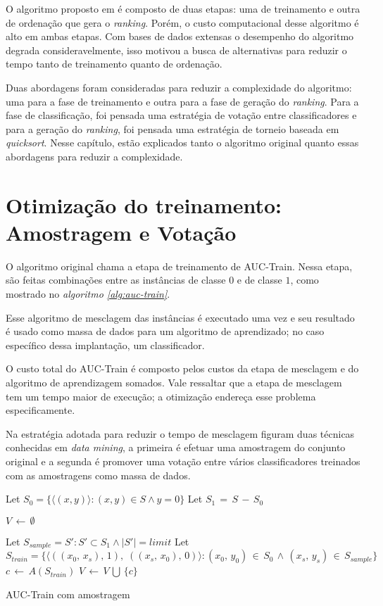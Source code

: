 O algoritmo proposto em é composto de duas etapas: uma de treinamento e outra de ordenação que gera o \emph{ranking}. Porém, o custo computacional desse algoritmo é alto em ambas etapas. Com bases de dados extensas o desempenho do algoritmo degrada consideravelmente, isso motivou a busca de alternativas para reduzir o tempo tanto de treinamento quanto de ordenação.

Duas abordagens foram consideradas para reduzir a complexidade do algoritmo: uma para a fase de treinamento e outra para a fase de geração do \emph{ranking}. Para a fase de classificação, foi pensada uma estratégia de votação entre classificadores e para a geração do \emph{ranking}, foi pensada uma estratégia de torneio baseada em \emph{quicksort}. Nesse capítulo, estão explicados tanto o algoritmo original quanto essas abordagens para reduzir a complexidade.

\section{Otimização do treinamento: Amostragem e Votação}
O algoritmo original chama a etapa de treinamento de AUC-Train. Nessa etapa, são feitas combinações entre as instâncias de classe $0$ e de classe $1$, como mostrado no \emph{algoritmo \ref{alg:auc-train}}.

Esse algoritmo de mesclagem das instâncias é executado uma vez e seu resultado é usado como massa de dados para um algoritmo de aprendizado; no caso específico dessa implantação, um classificador.

O custo total do AUC-Train é composto pelos custos da etapa de mesclagem e do algoritmo de aprendizagem somados. Vale ressaltar que a etapa de mesclagem tem um tempo maior de execução; a otimização endereça esse problema especificamente.

Na estratégia adotada para reduzir o tempo de mesclagem figuram duas técnicas conhecidas em \emph{data mining}, a primeira é efetuar uma amostragem do conjunto original e a segunda é promover uma votação entre vários classificadores treinados com as amostragens como massa de dados.

\begin{algorithm}
\begin{algorithmic}

\STATE Let $S_0 = \{\langle (x, y) \rangle: (x, y) \in S \wedge y = 0\}$
\STATE Let $S_1\,=\,S\,-\,S_0$

\STATE $V\,\gets\,\emptyset$

\STATE Let $S_{sample} = S' : S' \subset S_1 \wedge |S'| = limit$
\STATE Let $S_{train} = \{\langle ((x_{0},\,x_{s}),\, 1),\; ((x_{s},\, x_{0}),\,0) \rangle:
       (x_{0},\,y_{0})\,\in\,S_{0}\,\wedge\,
       (x_{s},\,y_{s})\,\in\,S_{sample}\}$
\STATE $c\,\gets\,A(S_{train})$
\STATE $V\,\gets\,V\,\bigcup\,\{c\}$
\ENDFOR

\caption{AUC-Train com amostragem}
\label{alg:auc-train-amostragem-votacao}

\end{algorithmic}
\end{algorithm}

